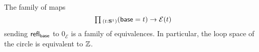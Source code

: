 \begin{comment}
\begin{proof}
We show that the total space satisfies singleton induction (i.e., we apply \cref{thm:contractible}). Let $P$ be a family over the total space of the fundamental cover, and let $p_0:P(\base,0_{\mathcal{E}})$. Our goal is to construct a term of type
\begin{equation*}
\prd{t:\sphere{1}}{x:\mathcal{E}(t)} P(t,x).
\end{equation*}
We do this by induction. For the base case we must construct a term of type
\begin{equation*}
\prd{k:\Z}P(\base,k_{\mathcal{E}}).
\end{equation*}
Since we have the identifications $s_k: (\base,k_{\mathcal{E}})=(\base,\mathsf{succ}(k)_{\mathcal{E}})$, we have the equivalences
\begin{equation*}
\mathsf{tr}_P(s_k) : \eqv{P(\base,k_{\mathcal{E}})}{P(\base,\mathsf{succ}(k)_{\mathcal{E}})}
\end{equation*}
for each $k:\Z$. Thus we obtain a dependent function $f:\prd{x:\mathcal{E}(\base)}P(\base,x)$ satisfying $f(0_{\mathcal{E}})=p_0$ and $f(\mathsf{succ}(k)_{\mathcal{E}})=\mathsf{tr}_P(s_k,f(k_{\mathcal{E}}))$, for each $k:\Z$. 

For the loop case we must show that
\begin{equation*}
\mathsf{tr}_Q(\lloop,f)=f,
\end{equation*}
where $Q$ is the family over $\sphere{1}$ given by $Q(t)\defeq \prd{x:\mathcal{E}(t)} P(t,x)$. By function extensionality it suffices to construct a homotopy, and the transport along $\lloop$ in $Q$ computes as
\begin{equation*}
\mathsf{tr}_Q(\lloop,f)(k_{\mathcal{E}})= \mathsf{tr}_P(s_k,f(\mathsf{succ}^{-1}(k)_{\mathcal{E}})). 
\end{equation*}
Therefore the following computation completes the proof:
\begin{align*}
\mathsf{tr}_Q(\lloop,f)(k_{\mathcal{E}})
& = \mathsf{tr}_P(s_k,f(\mathsf{succ}^{-1}(k)_{\mathcal{E}})) \\
& = f(\mathsf{succ}(\mathsf{succ}^{-1}(k))_{\mathcal{E}}) \\
& = f(k_{\mathcal{E}}).\qedhere
\end{align*}
\end{proof}
\end{comment}

\begin{thm}\label{thm:eq-circle}
  The family of maps
  \begin{equation*}
    \prd{t:\sphere{1}} (\base=t)\to \mathcal{E}(t)
  \end{equation*}
  sending $\mathsf{refl}_{\mathsf{base}}$ to $0_{\mathcal{E}}$ is a family of equivalences. In particular, the loop space of the circle is equivalent to ${\mathbb{Z}}$.
\end{thm}

